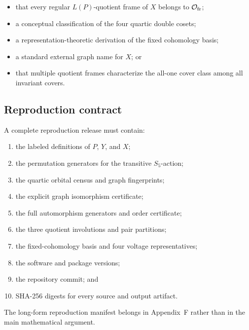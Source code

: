 \begin{itemize}

\item that every regular \(L(P)\)-quotient frame of \(X\) belongs to
\(\mathcal O_{\mathrm{fr}}\);

\item a conceptual classification of the four quartic double cosets;

\item a representation-theoretic derivation of the fixed cohomology basis;

\item a standard external graph name for \(X\); or

\item that multiple quotient frames characterize the all-one cover class
among all invariant covers.

\end{itemize}

\subsection{Reproduction contract}

A complete reproduction release must contain:

\begin{enumerate}

\item the labeled definitions of \(P\), \(Y\), and \(X\);

\item the permutation generators for the transitive \(S_5\)-action;

\item the quartic orbital census and graph fingerprints;

\item the explicit graph isomorphism certificate;

\item the full automorphism generators and order certificate;

\item the three quotient involutions and pair partitions;

\item the fixed-cohomology basis and four voltage representatives;

\item the software and package versions;

\item the repository commit; and

\item SHA-256 digests for every source and output artifact.

\end{enumerate}

The long-form reproduction manifest belongs in Appendix~F rather than in
the main mathematical argument.
